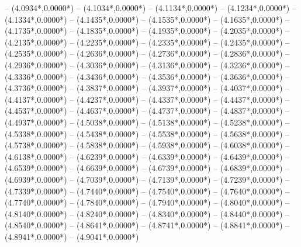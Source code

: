 {	-- ({4.0934*\dx},{0.0000*\dy})
	-- ({4.1034*\dx},{0.0000*\dy})
	-- ({4.1134*\dx},{0.0000*\dy})
	-- ({4.1234*\dx},{0.0000*\dy})
	-- ({4.1334*\dx},{0.0000*\dy})
	-- ({4.1435*\dx},{0.0000*\dy})
	-- ({4.1535*\dx},{0.0000*\dy})
	-- ({4.1635*\dx},{0.0000*\dy})
	-- ({4.1735*\dx},{0.0000*\dy})
	-- ({4.1835*\dx},{0.0000*\dy})
	-- ({4.1935*\dx},{0.0000*\dy})
	-- ({4.2035*\dx},{0.0000*\dy})
	-- ({4.2135*\dx},{0.0000*\dy})
	-- ({4.2235*\dx},{0.0000*\dy})
	-- ({4.2335*\dx},{0.0000*\dy})
	-- ({4.2435*\dx},{0.0000*\dy})
	-- ({4.2535*\dx},{0.0000*\dy})
	-- ({4.2636*\dx},{0.0000*\dy})
	-- ({4.2736*\dx},{0.0000*\dy})
	-- ({4.2836*\dx},{0.0000*\dy})
	-- ({4.2936*\dx},{0.0000*\dy})
	-- ({4.3036*\dx},{0.0000*\dy})
	-- ({4.3136*\dx},{0.0000*\dy})
	-- ({4.3236*\dx},{0.0000*\dy})
	-- ({4.3336*\dx},{0.0000*\dy})
	-- ({4.3436*\dx},{0.0000*\dy})
	-- ({4.3536*\dx},{0.0000*\dy})
	-- ({4.3636*\dx},{0.0000*\dy})
	-- ({4.3736*\dx},{0.0000*\dy})
	-- ({4.3837*\dx},{0.0000*\dy})
	-- ({4.3937*\dx},{0.0000*\dy})
	-- ({4.4037*\dx},{0.0000*\dy})
	-- ({4.4137*\dx},{0.0000*\dy})
	-- ({4.4237*\dx},{0.0000*\dy})
	-- ({4.4337*\dx},{0.0000*\dy})
	-- ({4.4437*\dx},{0.0000*\dy})
	-- ({4.4537*\dx},{0.0000*\dy})
	-- ({4.4637*\dx},{0.0000*\dy})
	-- ({4.4737*\dx},{0.0000*\dy})
	-- ({4.4837*\dx},{0.0000*\dy})
	-- ({4.4937*\dx},{0.0000*\dy})
	-- ({4.5038*\dx},{0.0000*\dy})
	-- ({4.5138*\dx},{0.0000*\dy})
	-- ({4.5238*\dx},{0.0000*\dy})
	-- ({4.5338*\dx},{0.0000*\dy})
	-- ({4.5438*\dx},{0.0000*\dy})
	-- ({4.5538*\dx},{0.0000*\dy})
	-- ({4.5638*\dx},{0.0000*\dy})
	-- ({4.5738*\dx},{0.0000*\dy})
	-- ({4.5838*\dx},{0.0000*\dy})
	-- ({4.5938*\dx},{0.0000*\dy})
	-- ({4.6038*\dx},{0.0000*\dy})
	-- ({4.6138*\dx},{0.0000*\dy})
	-- ({4.6239*\dx},{0.0000*\dy})
	-- ({4.6339*\dx},{0.0000*\dy})
	-- ({4.6439*\dx},{0.0000*\dy})
	-- ({4.6539*\dx},{0.0000*\dy})
	-- ({4.6639*\dx},{0.0000*\dy})
	-- ({4.6739*\dx},{0.0000*\dy})
	-- ({4.6839*\dx},{0.0000*\dy})
	-- ({4.6939*\dx},{0.0000*\dy})
	-- ({4.7039*\dx},{0.0000*\dy})
	-- ({4.7139*\dx},{0.0000*\dy})
	-- ({4.7239*\dx},{0.0000*\dy})
	-- ({4.7339*\dx},{0.0000*\dy})
	-- ({4.7440*\dx},{0.0000*\dy})
	-- ({4.7540*\dx},{0.0000*\dy})
	-- ({4.7640*\dx},{0.0000*\dy})
	-- ({4.7740*\dx},{0.0000*\dy})
	-- ({4.7840*\dx},{0.0000*\dy})
	-- ({4.7940*\dx},{0.0000*\dy})
	-- ({4.8040*\dx},{0.0000*\dy})
	-- ({4.8140*\dx},{0.0000*\dy})
	-- ({4.8240*\dx},{0.0000*\dy})
	-- ({4.8340*\dx},{0.0000*\dy})
	-- ({4.8440*\dx},{0.0000*\dy})
	-- ({4.8540*\dx},{0.0000*\dy})
	-- ({4.8641*\dx},{0.0000*\dy})
	-- ({4.8741*\dx},{0.0000*\dy})
	-- ({4.8841*\dx},{0.0000*\dy})
	-- ({4.8941*\dx},{0.0000*\dy})
	-- ({4.9041*\dx},{0.0000*\dy})
}
